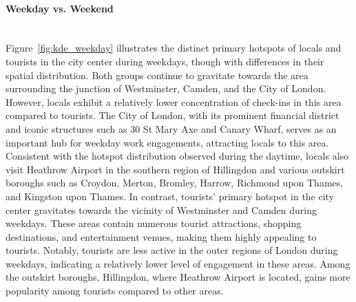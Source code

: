 \documentclass{article}
\newcommand{\subsubsubsection}[1]{\paragraph{#1}\mbox{}\\}
\theoremstyle{definition}
\theoremstyle{remark}
\begin{document}
\subsubsubsection{Weekday vs. Weekend}
Figure~\ref{fig:kde_weekday} illustrates the distinct primary hotspots of locals and tourists in the city center during weekdays, though with differences in their spatial distribution. Both groups continue to gravitate towards the area surrounding the junction of Westminster, Camden, and the City of London. However, locals exhibit a relatively lower concentration of check-ins in this area compared to tourists. The City of London, with its prominent financial district and iconic structures such as 30 St Mary Axe and Canary Wharf, serves as an important hub for weekday work engagements, attracting locals to this area. Consistent with the hotspot distribution observed during the daytime, locals also visit Heathrow Airport in the southern region of Hillingdon and various outskirt boroughs such as Croydon, Merton, Bromley, Harrow, Richmond upon Thames, and Kingston upon Thames. In contrast, tourists' primary hotspot in the city center gravitates towards the vicinity of Westminster and Camden during weekdays. These areas contain numerous tourist attractions, shopping destinations, and entertainment venues, making them highly appealing to tourists. Notably, tourists are less active in the outer regions of London during weekdays, indicating a relatively lower level of engagement in these areas. Among the outskirt boroughs, Hillingdon, where Heathrow Airport is located, gains more popularity among tourists compared to other areas.
\end{document}
